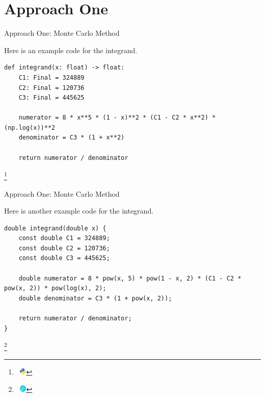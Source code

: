 \documentclass[10pt, xcolor = svgnames]{beamer} %
\newcommand{\PYTHON}[0]{~\includegraphics[height = 9.5pt]{./logos/Python.pdf}}
\newcommand{\CERN}[0]{~\includegraphics[height = 9.5pt]{./logos/CERN_ROOT.pdf}}
\newcommand\blfootnote[1]{
  \begingroup
  \renewcommand\thefootnote{}\footnote{#1}
  \addtocounter{footnote}{-1}
  \endgroup
}
\begin{document}
\section{Approach One}








\begin{frame}[fragile]{Approach One: Monte Carlo Method}


Here is an example code for the integrand.
\lstset{language=Python}
\begin{lstlisting}
def integrand(x: float) -> float:
    C1: Final = 324889
    C2: Final = 120736
    C3: Final = 445625

    numerator = 8 * x**5 * (1 - x)**2 * (C1 - C2 * x**2) * (np.log(x))**2
    denominator = C3 * (1 + x**2)

    return numerator / denominator
\end{lstlisting}
\blfootnote{\PYTHON}
\lstset{language=FORTRAN}
\end{frame}


\begin{frame}[fragile]{Approach One: Monte Carlo Method}


Here is another example code for the integrand.
\lstset{language=C++}
\begin{lstlisting}
double integrand(double x) {
    const double C1 = 324889;
    const double C2 = 120736;
    const double C3 = 445625;
	
    double numerator = 8 * pow(x, 5) * pow(1 - x, 2) * (C1 - C2 * pow(x, 2)) * pow(log(x), 2);
    double denominator = C3 * (1 + pow(x, 2));
    
    return numerator / denominator;
}
\end{lstlisting}
\blfootnote{\CERN}
\lstset{language=FORTRAN}
\end{frame}
\end{document}
